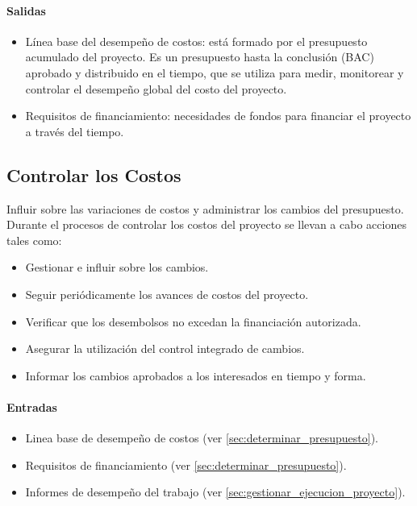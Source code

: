 \documentclass[a4paper,twosides]{article}
\newlength{\wideitemsep}
\let\olditem\item
\renewcommand{\item}{\setlength{\itemsep}{\wideitemsep}\olditem}
\begin{document}
\paragraph{Salidas}

\begin{itemize}
\item Línea base del desempeño de costos: está formado por el presupuesto acumulado del proyecto. Es un presupuesto hasta la conclusión (BAC) aprobado y distribuido en el tiempo, que se utiliza para medir, monitorear y controlar el desempeño global del costo del proyecto.
\item Requisitos de financiamiento: necesidades de fondos para financiar el proyecto a través del tiempo.
\end{itemize}


\subsection{Controlar los Costos} \label{sec:controlar_costos}
Influir sobre las variaciones de costos y administrar los cambios del presupuesto.
Durante el procesos de controlar los costos del proyecto se llevan a cabo acciones tales como:
\begin{itemize}
\item Gestionar e influir sobre los cambios.
\item Seguir periódicamente los avances de costos del proyecto.
\item Verificar que los desembolsos no excedan la financiación autorizada.
\item Asegurar la utilización del control integrado de cambios.
\item Informar los cambios aprobados a los interesados en tiempo y forma.
\end{itemize}

\paragraph{Entradas}
\begin{itemize}
\item Linea base de desempeño de costos (ver \ref{sec:determinar_presupuesto}).
\item Requisitos de financiamiento (ver \ref{sec:determinar_presupuesto}).
\item Informes de desempeño del trabajo (ver \ref{sec:gestionar_ejecucion_proyecto}).
\end{itemize}
\end{document}
